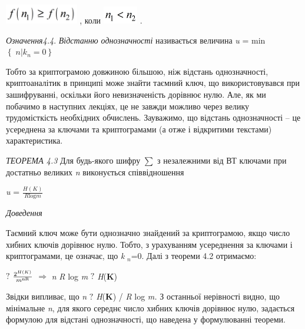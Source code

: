 \documentclass[a4paper]{article}
\newcounter{}
\newcommand\normalsubformula[1]{\text{\mathversion{normal}$#1$}}
\begin{document}
{\centering
 \includegraphics[width=1.2555in,height=0.3339in]{crypt-img/crypt-img43.png} , 
коли  
\includegraphics[width=0.598in,height=0.2984in]{crypt-img/crypt-img44.png} .
\par}

\textit{Означення4.4}. \textit{Відстанню  однозначності} називається
величина\textit{  } \textit{u}\textit{ }= min 
${\left\{\;n|k_{{n}}\right.=0\left.\right\}}$

Тобто  за криптограмою довжиною більшою, ніж відстань однозначності,
криптоаналітик в принципі може знайти таємний ключ, що використовувався при
зашифруванні, оскільки його невизначеність дорівнює нулю. Але, як ми побачимо в
наступних лекціях, це не завжди можливо через  велику трудомісткість необхідних
обчислень. Зауважимо, що відстань однозначності – це усереднена за ключами та
криптограмами (а отже і відкритими текстами) характеристика.

\textit{ТЕОРЕМА 4.3 } Для будь-якого шифру   ${\sum {}}$ з незалежними від ВТ 
ключами  при достатньо великих \textit{n} виконується  співвідношення

{\centering
\textit{u}\textit{ }=   ${\frac{H(K)}{R\text{log}m}}$
\par}

{\itshape
Доведення}

 Таємний ключ може бути однозначно знайдений за  криптограмою, якщо число хибних
ключів дорівнює нулю. Тобто, з урахуванням усереднення за ключами і
криптограмами, це означає, що\textit{  }\textit{k} ${{}_{{n}}}$=0. Далі з
теореми 4.2 отримаємо: 

{   ${?}$   ${\frac{2^{{H(K)}}}{m^{{\normalsubformula{\text{nR}}}}}}$  
${\Rightarrow }$\textit{  }\textit{n}\textit{ }\textit{R}\textit{ }log
\textit{m}  ${?}$  \textit{H}(\textbf{K}) 
\par}


\bigskip

Звідки  випливає, що  \textit{n}  ${?}$  \textit{H}(\textbf{K}) / \textit{R} log
\textit{m}\textit{.}\textit{ }З останньої нерівності видно, що мінімальне
\textit{n}, для якого середнє число хибних ключів дорівнює нулю, задається
формулою для відстані однозначності, що наведена у формулюванні теореми.   $ $
$ $ 
\end{document}
